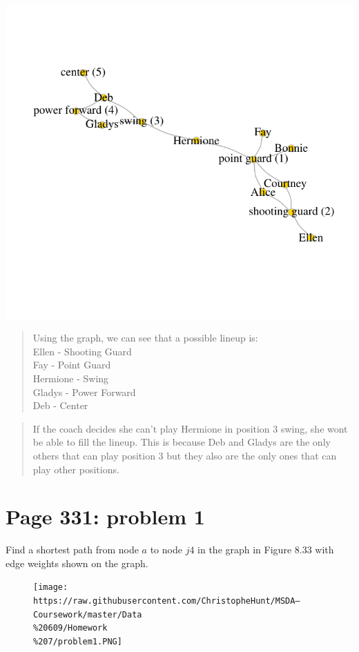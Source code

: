 \documentclass[]{article}
\begin{document}
\includegraphics{Christophe_Hunt_hw7_files/figure-latex/unnamed-chunk-2-1.pdf}

\begin{quote}
Using the graph, we can see that a possible lineup is:\\
Ellen - Shooting Guard\\
Fay - Point Guard\\
Hermione - Swing\\
Gladys - Power Forward\\
Deb - Center
\end{quote}

\begin{quote}
If the coach decides she can't play Hermione in position 3 swing, she
wont be able to fill the lineup. This is because Deb and Gladys are the
only others that can play position 3 but they also are the only ones
that can play other positions.
\end{quote}

\newpage

\section{Page 331: problem 1}\label{page-331-problem-1}

Find a shortest path from node \(a\) to node \(j4\) in the graph in
Figure 8.33 with edge weights shown on the graph.

\begin{figure}[htbp]
\centering
\texttt{[image: https://raw.githubusercontent.com/ChristopheHunt/MSDA---Coursework/master/Data\\\%20609/Homework\\\%207/problem1.PNG]}
\caption{}
\end{figure}
\end{document}
